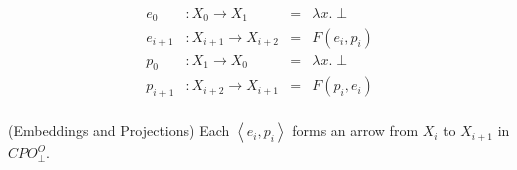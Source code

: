 \begin{displaymath}
  \begin{array}{llcl}
    e_0     & : X_0 \to X_1 & = &\lambda x.\; \bot \\
    e_{i+1} & : X_{i+1} \to X_{i+2} & = & F(e_i, p_i) \\[0.5em]
    p_0 &  : X_1 \to X_0 & = & \lambda x.\; \bot \\
    p_{i+1} & : X_{i+2} \to X_{i+1} & = & F(p_i, e_i) \\[0.5em]
  \end{array}
\end{displaymath}

\begin{lemma}{(Embeddings and Projections)} Each $\left<e_i, p_i\right>$ forms
an arrow from $X_i$ to $X_{i+1}$ in $CPO_\bot^O$.
\end{lemma}

